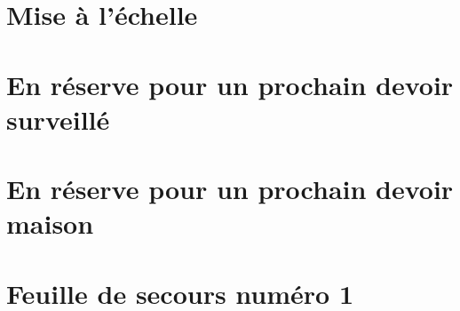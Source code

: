 \section{Mise à l'échelle}



\section{En réserve pour un prochain devoir surveillé}



\section{En réserve pour un prochain devoir maison}


\section{Feuille de secours numéro 1}




